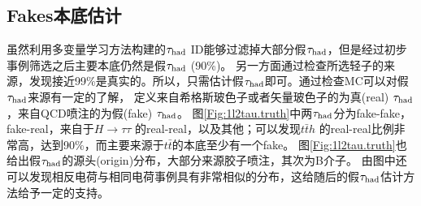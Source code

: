 \subsection{Fakes本底估计}\label{subsec:fakes_tau}
虽然利用多变量学习方法构建的$\tau_{\text{had}}$ ID能够过滤掉大部分假$\tau_{\text{had}}$，但是\ltwotau 经过初步事例筛选之后主要本底仍然是假$\tau_{\text{had}}$ (90\%)。
另一方面通过检查所选轻子的来源，发现接近99\%是真实的。所以，只需估计假$\tau_{\text{had}}$即可。通过检查MC可以对假$\tau_{\text{had}}$来源有一定的了解，
定义来自希格斯玻色子或者矢量玻色子的为真(real) $\tau_{\text{had}}$，来自QCD喷注的为假(fake) $\tau_{\text{had}}$。
图\ref{Fig:1l2tau.truth}中两$\tau_{\text{had}}$分为fake-fake，fake-real，来自于$H\rightarrow \tau\tau$
的real-real，以及其他；可以发现$t \bar{t}h$ 的real-real比例非常高，达到90\%，而主要来源于$t\bar{t}$的本底至少有一个fake。
图\ref{Fig:1l2tau.truth}也给出假$\tau_{\text{had}}$的源头(origin)分布，大部分来源胶子喷注，其次为B介子。
由图中还可以发现相反电荷与相同电荷事例具有非常相似的分布，这给随后的假$\tau_{\text{had}}$估计方法给予一定的支持。
